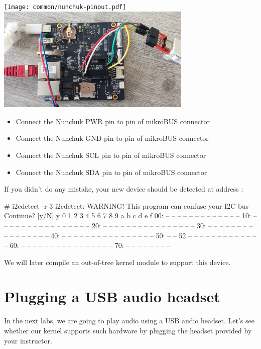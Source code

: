 \texttt{[image: common/nunchuk-pinout.pdf]}
\includegraphics[width=0.7\textwidth]{common/beagleplay-connect-nunchuk.jpg}

\begin{itemize}
\item Connect the Nunchuk PWR pin to  pin of mikroBUS connector
\item Connect the Nunchuk GND pin to  pin of mikroBUS connector
\item Connect the Nunchuk SCL pin to  pin of mikroBUS connector
\item Connect the Nunchuk SDA pin to  pin of mikroBUS connector
\end{itemize}

If you didn't do any mistake, your new device should be detected at
address :

\begin{bashinput}
# i2cdetect -r 3
i2cdetect: WARNING! This program can confuse your I2C bus
Continue? [y/N] y
     0  1  2  3  4  5  6  7  8  9  a  b  c  d  e  f
00:          -- -- -- -- -- -- -- -- -- -- -- -- --
10: -- -- -- -- -- -- -- -- -- -- -- -- -- -- -- --
20: -- -- -- -- -- -- -- -- -- -- -- -- -- -- -- --
30: -- -- -- -- -- -- -- -- -- -- -- -- -- -- -- --
40: -- -- -- -- -- -- -- -- -- -- -- -- -- -- -- --
50: -- -- 52 -- -- -- -- -- -- -- -- -- -- -- -- --
60: -- -- -- -- -- -- -- -- -- -- -- -- -- -- -- --
70: -- -- -- -- -- -- -- --
\end{bashinput}

We will later compile an out-of-tree kernel module to support this device.

\section{Plugging a USB audio headset}

In the next labs, we are going to play audio using a USB audio headset.
Let's see whether our kernel supports such hardware by plugging the
headset provided by your instructor.

